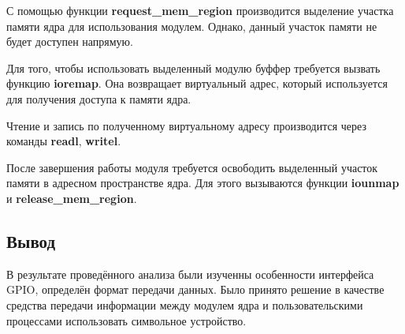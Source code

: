 С помощью функции \textbf{request\_mem\_region} производится выделение участка памяти ядра для использования модулем. Однако, данный участок памяти не будет доступен напрямую.

Для того, чтобы использовать выделенный модулю буффер требуется вызвать функцию \textbf{ioremap}. Она возвращает виртуальный адрес, который используется для получения доступа к памяти ядра.

Чтение и запись по полученному виртуальному адресу производится через команды \textbf{readl}, \textbf{writel}.

После завершения работы модуля требуется освободить выделенный участок памяти в адресном пространстве ядра. Для этого вызываются функции \textbf{iounmap} и \textbf{release\_mem\_region}.

\subsection*{Вывод}
В результате проведённого анализа были изученны особенности интерфейса GPIO, определён формат передачи данных. Было принято решение в качестве средства передачи информации между модулем ядра и пользовательскими процессами использовать символьное устройство.
